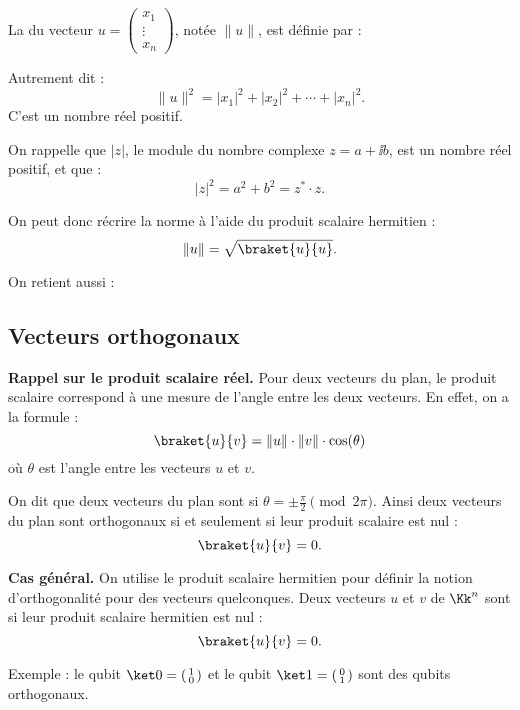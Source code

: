 \documentclass[11pt,class=report,crop=false]{standalone}
\begin{document}

La  du vecteur $u = \left(\begin{smallmatrix}x_1\\\vdots\\x_n\end{smallmatrix}\right)$, notée $\|u\|$, est
définie par :

Autrement dit :
$$\|u\|^2 = |x_1|^2 + |x_2|^2 + \cdots + |x_n|^2.$$
C'est un nombre réel positif.


On rappelle que $|z|$, le module du nombre complexe $z=a+\ii b$, est un nombre réel positif, et que :
$$|z|^2 = a^2+b^2 =  z^* \cdot z.$$

On peut donc récrire la norme à l'aide du produit scalaire hermitien :
$$\|u\| = \sqrt{\braket{u}{u}}.$$

On retient aussi :


\subsection{Vecteurs orthogonaux}

\textbf{Rappel sur le produit scalaire réel.}
Pour deux vecteurs du plan, le produit scalaire correspond à une mesure de l'angle entre les deux vecteurs. En effet, on a la formule :
$$\braket{u}{v} = \| u \| \cdot \| v \| \cdot \cos(\theta)$$
où $\theta$ est l'angle entre les vecteurs $u$ et $v$.



On dit que deux vecteurs du plan sont  si $\theta = \pm \frac\pi2 \pmod{2\pi}$.
Ainsi deux vecteurs du plan sont orthogonaux si et seulement si leur produit scalaire est nul :
$$\braket{u}{v} = 0.$$



\bigskip
\textbf{Cas général.}
On utilise le produit scalaire hermitien pour définir la notion d'orthogonalité pour des vecteurs quelconques. 
Deux vecteurs $u$ et $v$ de $\Kk^n$ sont 
si leur produit scalaire hermitien est nul :
$$\braket{u}{v} = 0.$$


Exemple : le qubit $\ket 0 = \left(\begin{smallmatrix}1\\0\end{smallmatrix}\right)$ et le qubit $\ket 1 = \left(\begin{smallmatrix}0\\1\end{smallmatrix}\right)$ sont des qubits orthogonaux.
\end{document}
